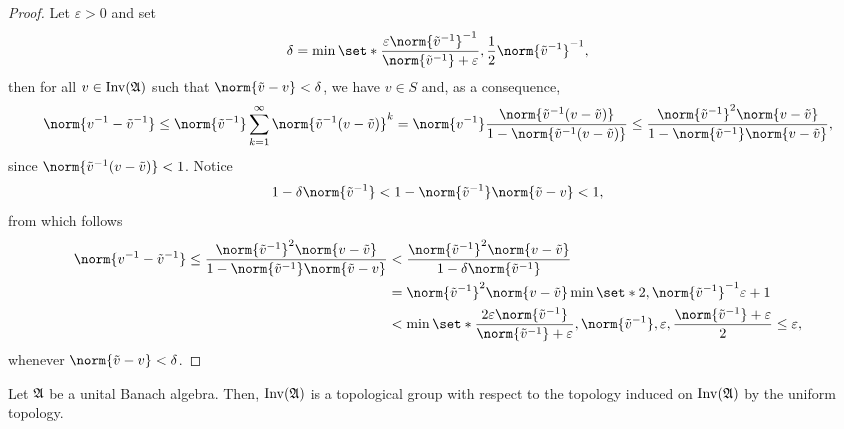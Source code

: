 \begin{proof}
    Let \(\varepsilon > 0\) and set
    \begin{equation*}
        \delta = \min\set*{\frac{\varepsilon\norm{\tilde{v}^{-1}}^{-1}}{\norm{\tilde{v}^{-1}} + \varepsilon}, \frac12\norm{\tilde{v}^{-1}}^{-1}},
    \end{equation*}
    then for all \(v \in \operatorname{Inv}(\mathfrak{A})\) such that \(\norm{\tilde{v} - v} < \delta\),  we have \(v \in S\) and, as a consequence,
    \begin{equation*}
        \norm{v^{-1} - \tilde{v}^{-1}} \leq \norm{\tilde{v}^{-1}} \sum_{k=1}^\infty \norm{\tilde{v}^{-1}(v - \tilde{v})}^k = \norm{v^{-1}} \frac{\norm{\tilde{v}^{-1}(v - \tilde{v})}}{1 - \norm{\tilde{v}^{-1}(v - \tilde{v})}} \leq \frac{\norm{\tilde{v}^{-1}}^2\norm{v - \tilde{v}}}{1 - \norm{\tilde{v}^{-1}}\norm{v - \tilde{v}}},
    \end{equation*}
    since \(\norm{\tilde{v}^{-1}(v-\tilde{v})} < 1\). Notice
    \begin{equation*}
        1 - \delta \norm{\tilde{v}^{-1}} < 1 - \norm{\tilde{v}^{-1}}\norm{\tilde{v} - v} < 1,
    \end{equation*}
    from which follows
    \begin{align*}
        \norm{v^{-1} - \tilde{v}^{-1}} \leq \frac{\norm{\tilde{v}^{-1}}^2\norm{v - \tilde{v}}}{1 - \norm{\tilde{v}^{-1}} \norm{\tilde{v} - v}} &< \frac{\norm{\tilde{v}^{-1}}^2\norm{v - \tilde{v}}}{1 - \delta \norm{\tilde{v}^{-1}}} \\
        &= \norm{\tilde{v}^{-1}}^2\norm{v - \tilde{v}}\min\set*{2, \norm{\tilde{v}^{-1}}^{-1}\varepsilon + 1}\\
        &< \min\set*{\frac{2 \varepsilon \norm{\tilde{v}^{-1}}}{\norm{\tilde{v}^{-1}} + \varepsilon}, \norm{\tilde{v}^{-1}}, \varepsilon, \frac{\norm{\tilde{v}^{-1}} + \varepsilon}2} \leq \varepsilon,
    \end{align*}
    whenever \(\norm{\tilde{v} - v} < \delta\).
\end{proof}
\begin{corollary}
    Let \(\mathfrak{A}\) be a unital Banach algebra. Then, \(\operatorname{Inv}(\mathfrak{A})\) is a topological group with respect to the topology induced on \(\operatorname{Inv}(\mathfrak{A})\) by the uniform topology.
\end{corollary}
